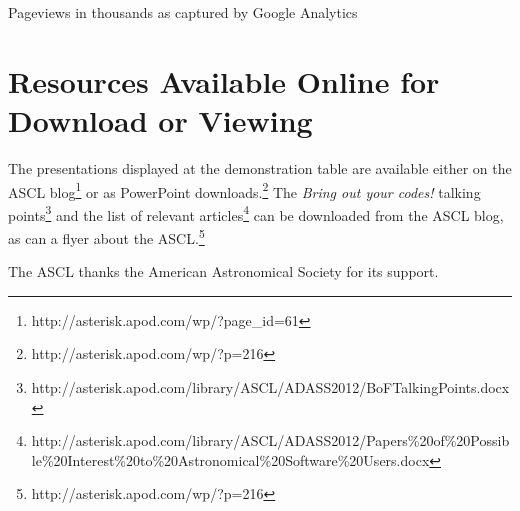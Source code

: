{Pageviews in thousands as captured by Google Analytics}


\section{Resources Available Online for Download or Viewing}
The presentations displayed at the demonstration table are available either on the ASCL blog\footnote{http://asterisk.apod.com/wp/?page\_id=61} or as PowerPoint downloads.\footnote{http://asterisk.apod.com/wp/?p=216} The {\em Bring out your codes!} talking points\footnote{http://asterisk.apod.com/library/ASCL/ADASS2012/BoFTalkingPoints.docx} and the list of relevant articles\footnote{http://asterisk.apod.com/library/ASCL/ADASS2012/Papers\%20of\%20Possible\%20Interest\%20to\%20Astronomical\%20Software\%20Users.docx} can be downloaded from the ASCL blog, as can a flyer about the ASCL.\footnote{http://asterisk.apod.com/wp/?p=216}


\acknowledgements The ASCL thanks the American Astronomical Society for its support.




